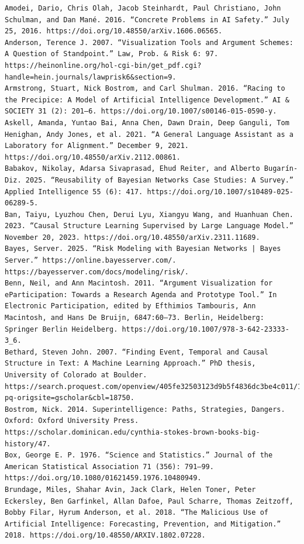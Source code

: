\documentclass[
  11pt,
  letterpaper,
]{book}
\begin{document}
\begin{verbatim}
Amodei, Dario, Chris Olah, Jacob Steinhardt, Paul Christiano, John Schulman, and Dan Mané. 2016. “Concrete Problems in AI Safety.” July 25, 2016. https://doi.org/10.48550/arXiv.1606.06565.
Anderson, Terence J. 2007. “Visualization Tools and Argument Schemes: A Question of Standpoint.” Law, Prob. & Risk 6: 97. https://heinonline.org/hol-cgi-bin/get_pdf.cgi?handle=hein.journals/lawprisk6&section=9.
Armstrong, Stuart, Nick Bostrom, and Carl Shulman. 2016. “Racing to the Precipice: A Model of Artificial Intelligence Development.” AI & SOCIETY 31 (2): 201–6. https://doi.org/10.1007/s00146-015-0590-y.
Askell, Amanda, Yuntao Bai, Anna Chen, Dawn Drain, Deep Ganguli, Tom Henighan, Andy Jones, et al. 2021. “A General Language Assistant as a Laboratory for Alignment.” December 9, 2021. https://doi.org/10.48550/arXiv.2112.00861.
Babakov, Nikolay, Adarsa Sivaprasad, Ehud Reiter, and Alberto Bugarín-Diz. 2025. “Reusability of Bayesian Networks Case Studies: A Survey.” Applied Intelligence 55 (6): 417. https://doi.org/10.1007/s10489-025-06289-5.
Ban, Taiyu, Lyuzhou Chen, Derui Lyu, Xiangyu Wang, and Huanhuan Chen. 2023. “Causal Structure Learning Supervised by Large Language Model.” November 20, 2023. https://doi.org/10.48550/arXiv.2311.11689.
Bayes, Server. 2025. “Risk Modeling with Bayesian Networks | Bayes Server.” https://online.bayesserver.com/. https://bayesserver.com/docs/modeling/risk/.
Benn, Neil, and Ann Macintosh. 2011. “Argument Visualization for eParticipation: Towards a Research Agenda and Prototype Tool.” In Electronic Participation, edited by Efthimios Tambouris, Ann Macintosh, and Hans De Bruijn, 6847:60–73. Berlin, Heidelberg: Springer Berlin Heidelberg. https://doi.org/10.1007/978-3-642-23333-3_6.
Bethard, Steven John. 2007. “Finding Event, Temporal and Causal Structure in Text: A Machine Learning Approach.” PhD thesis, University of Colorado at Boulder. https://search.proquest.com/openview/405fe32503123d9b5f4836dc3be4c011/1?pq-origsite=gscholar&cbl=18750.
Bostrom, Nick. 2014. Superintelligence: Paths, Strategies, Dangers. Oxford: Oxford University Press. https://scholar.dominican.edu/cynthia-stokes-brown-books-big-history/47.
Box, George E. P. 1976. “Science and Statistics.” Journal of the American Statistical Association 71 (356): 791–99. https://doi.org/10.1080/01621459.1976.10480949.
Brundage, Miles, Shahar Avin, Jack Clark, Helen Toner, Peter Eckersley, Ben Garfinkel, Allan Dafoe, Paul Scharre, Thomas Zeitzoff, Bobby Filar, Hyrum Anderson, et al. 2018. “The Malicious Use of Artificial Intelligence: Forecasting, Prevention, and Mitigation.” 2018. https://doi.org/10.48550/ARXIV.1802.07228.

\end{verbatim}
\end{document}
